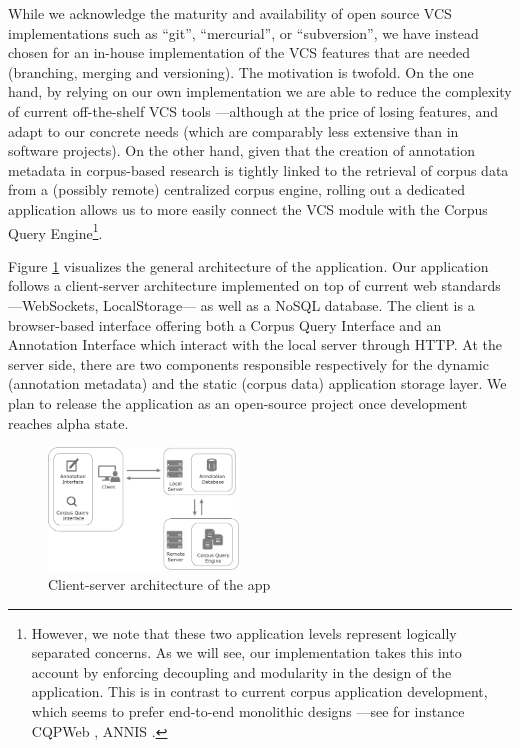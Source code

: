 \documentclass{sig-alternate}
\begin{document}
While we acknowledge the maturity and availability of open source VCS implementations such as
``git'', ``mercurial'', or ``subversion'', we have instead chosen for an in-house implementation
of the VCS features that are needed (branching, merging and versioning). The motivation is twofold.
On the one hand, by relying on our own implementation we are able to reduce the complexity of
current off-the-shelf VCS tools ---although at the price of losing features,
and adapt to our concrete needs (which are comparably less extensive than in software projects).
On the other hand, given that the creation of annotation metadata in corpus-based research
is tightly linked to the retrieval of corpus data from a (possibly remote) centralized corpus engine,
rolling out a dedicated application allows us to more easily connect the VCS module with the Corpus
Query Engine\footnote{
  However, we note that these two application levels represent logically separated concerns.
  As we will see, our implementation takes this into account by enforcing decoupling and modularity
  in the design of the application. This is in contrast to current corpus application development,
  which seems to prefer end-to-end monolithic designs ---see for instance
  CQPWeb \cite{Hardie2012}, ANNIS \cite{Zeldes2009}.
}.

Figure \ref{fig:app} visualizes the general architecture of the application.
Our application follows a client-server architecture implemented on top of current web
standards ---WebSockets, LocalStorage--- as well as a NoSQL database.
The client is a browser-based interface offering both a Corpus Query Interface and an Annotation
Interface which interact with the local server through HTTP.
At the server side, there are two components responsible respectively for the dynamic (annotation
metadata) and the static (corpus data) application storage layer. We plan to release the
application as an open-source project once development reaches alpha state.

\begin{figure}
  \centering
  \includegraphics[width=0.45\textwidth]{./img/app-remote.pdf}
  \caption{\label{fig:app}Client-server architecture of the app}
\end{figure}
\end{document}
